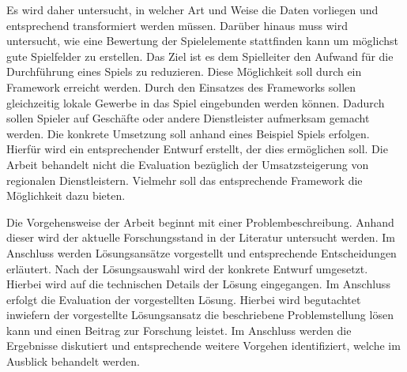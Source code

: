 Es wird daher untersucht, in welcher Art und Weise die Daten vorliegen und entsprechend transformiert werden müssen.
Darüber hinaus muss wird untersucht, wie eine Bewertung der Spielelemente stattfinden kann um möglichst gute Spielfelder zu erstellen.
Das Ziel ist es dem Spielleiter den Aufwand für die Durchführung eines Spiels zu reduzieren. Diese Möglichkeit soll durch ein Framework erreicht werden. Durch den Einsatzes des Frameworks sollen gleichzeitig lokale Gewerbe in das Spiel eingebunden werden können. Dadurch sollen Spieler auf Geschäfte oder andere Dienstleister aufmerksam gemacht werden.
Die konkrete Umsetzung soll anhand eines Beispiel Spiels erfolgen.
Hierfür wird ein entsprechender Entwurf erstellt, der dies ermöglichen soll.
Die Arbeit behandelt nicht die Evaluation bezüglich der Umsatzsteigerung von regionalen Dienstleistern. Vielmehr soll das entsprechende Framework die Möglichkeit dazu bieten.

Die Vorgehensweise der Arbeit beginnt mit einer Problembeschreibung. Anhand dieser wird der aktuelle Forschungsstand in der Literatur untersucht werden. Im Anschluss werden Lösungsansätze vorgestellt und entsprechende Entscheidungen erläutert. Nach der Lösungsauswahl wird der konkrete Entwurf umgesetzt. Hierbei wird auf die technischen Details der Lösung eingegangen. Im Anschluss erfolgt die Evaluation der vorgestellten Lösung. Hierbei wird begutachtet inwiefern der vorgestellte Lösungsansatz die beschriebene Problemstellung lösen kann und einen Beitrag zur Forschung leistet. Im Anschluss werden die Ergebnisse diskutiert und entsprechende weitere Vorgehen identifiziert, welche im Ausblick behandelt werden.

